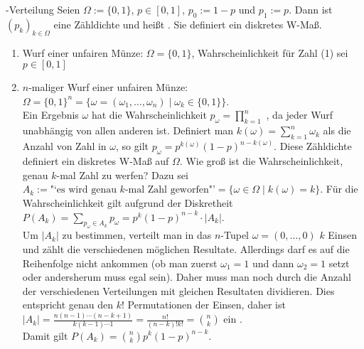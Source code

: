 \linie

\begin{Def}{-Verteilung}
    Seien $\Omega := \{0, 1\}$, $p \in [0, 1]$, $p_0 := 1 - p$ und $p_1 := p$.
    Dann ist $(p_k)_{k \in \Omega}$ eine Zähldichte und
    heißt .
    Sie definiert ein diskretes W-Maß.
\end{Def}

\begin{Bsp}
    \begin{enumerate}
        \item
        Wurf einer unfairen Münze: $\Omega = \{0, 1\}$,
        Wahrscheinlichkeit für Zahl (1) sei $p \in [0, 1]$

        \item
        $n$-maliger Wurf einer unfairen Münze: $\Omega = \{0, 1\}^n =
        \{\omega = (\omega_1, \dotsc, \omega_n) \;|\; \omega_k \in \{0, 1\}\}$.\\
        Ein Ergebnis $\omega$ hat die Wahrscheinlichkeit
        $p_\omega = \prod_{k=1}^n$
        ,
        da jeder Wurf unabhängig von allen anderen ist.
        Definiert man $k(\omega) = \sum_{k=1}^n \omega_k$ als die Anzahl von Zahl in $\omega$,
        so gilt $p_\omega = p^{k(\omega)} (1 - p)^{n - k(\omega)}$.
        Diese Zähldichte definiert ein diskretes W-Maß auf $\Omega$.
        Wie groß ist die Wahrscheinlichkeit, genau $k$-mal Zahl zu werfen?
        Dazu sei\\
        $A_k := \text{"`es wird genau } k\text{-mal Zahl geworfen"'} =
        \{\omega \in \Omega \;|\; k(\omega) = k\}$.
        Für die Wahrscheinlichkeit gilt aufgrund der Diskretheit
        $P(A_k) = \sum_{p_\omega \in A_k} p_\omega = p^k (1 - p)^{n-k} \cdot |A_k|$.\\
        Um $|A_k|$ zu bestimmen, verteilt man in das $n$-Tupel $\omega = (0, \dotsc, 0)$ $k$
        Einsen und zählt die verschiedenen möglichen Resultate.
        Allerdings darf es auf die Reihenfolge nicht ankommen
        (ob man zuerst $\omega_1 = 1$ und dann $\omega_2 = 1$ setzt oder andersherum muss
        egal sein).
        Daher muss man noch durch die Anzahl der verschiedenen Verteilungen mit gleichen Resultaten
        dividieren.
        Dies entspricht genau den $k!$ Permutationen der Einsen, daher ist
        $|A_k| = \frac{n (n - 1) \dotsm (n - k + 1)}{k (k - 1) \dotsm 1} =
        \frac{n!}{(n - k)! k!} = \binom{n}{k}$ ein .\\
        Damit gilt $P(A_k) = \binom{n}{k} p^k (1 - p)^{n-k}$.
    \end{enumerate}
\end{Bsp}

